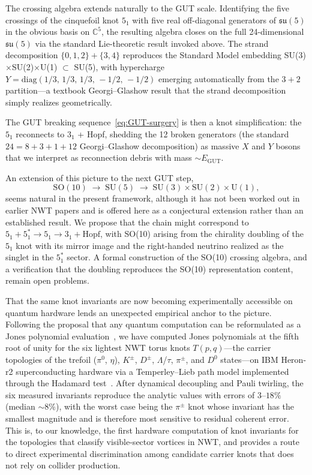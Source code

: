 \documentclass[11pt]{article}
\begin{document}
The crossing algebra extends naturally to the GUT scale.
Identifying the five crossings of the cinquefoil knot $5_1$ with five real off-diagonal generators of $\mathfrak{su}(5)$ in the obvious basis on $\mathbb{C}^5$, the resulting algebra closes on the full 24-dimensional $\mathfrak{su}(5)$ via the standard Lie-theoretic result invoked above.
The strand decomposition $\{0,1,2\} + \{3,4\}$ reproduces the Standard Model embedding SU(3)$\times$SU(2)$\times$U(1) $\subset$ SU(5), with hypercharge $Y = \text{diag}(1/3,\,1/3,\,1/3,\,-1/2,\,-1/2)$ emerging automatically from the $3+2$ partition---a textbook Georgi--Glashow result that the strand decomposition simply realizes geometrically.

The GUT breaking sequence~\eqref{eq:GUT-surgery} is then a knot simplification: the $5_1$ reconnects to $3_1$ + Hopf, shedding the 12 broken generators (the standard $24 = 8 + 3 + 1 + 12$ Georgi--Glashow decomposition) as massive $X$ and $Y$ bosons that we interpret as reconnection debris with mass $\sim E_\text{GUT}$.

An extension of this picture to the next GUT step,
\begin{equation}
\text{SO}(10) \;\to\; \text{SU}(5) \;\to\; \text{SU}(3)\times\text{SU}(2)\times\text{U}(1),
\end{equation}
seems natural in the present framework, although it has not been worked out in earlier NWT papers and is offered here as a conjectural extension rather than an established result.
We propose that the chain might correspond to $5_1 + 5_1^* \to 5_1 \to 3_1 + \text{Hopf}$, with SO(10) arising from the chirality doubling of the $5_1$ knot with its mirror image and the right-handed neutrino realized as the singlet in the $5_1^*$ sector.
A formal construction of the SO(10) crossing algebra, and a verification that the doubling reproduces the SO(10) representation content, remain open problems.

That the same knot invariants are now becoming experimentally accessible on quantum hardware lends an unexpected empirical anchor to the picture.
Following the proposal that any quantum computation can be reformulated as a Jones polynomial evaluation~\cite{Meichanetzidis2025}, we have computed Jones polynomials at the fifth root of unity for the six lightest NWT torus knots $T(p,q)$---the carrier topologies of the trefoil ($\pi^0$, $\eta$), $K^\pm$, $D^\pm$, $\Lambda$/$\tau$, $\pi^\pm$, and $D^0$ states---on IBM Heron-r2 superconducting hardware via a Temperley--Lieb path model implemented through the Hadamard test~\cite{NWTJonesQC}.
After dynamical decoupling and Pauli twirling, the six measured invariants reproduce the analytic values with errors of $3$--$18\%$ (median $\sim 8\%$), with the worst case being the $\pi^\pm$ knot whose invariant has the smallest magnitude and is therefore most sensitive to residual coherent error.
This is, to our knowledge, the first hardware computation of knot invariants for the topologies that classify visible-sector vortices in NWT, and provides a route to direct experimental discrimination among candidate carrier knots that does not rely on collider production.
\end{document}
